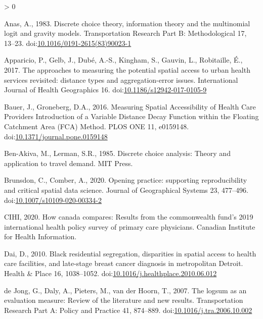 \documentclass[]{elsarticle} %
\newlength{\cslhangindent}
\newenvironment{CSLReferences}[2] %
 {%
  \setlength{\parindent}{0pt}
  \ifodd #1 \everypar{\setlength{\hangindent}{\cslhangindent}}\ignorespaces\fi
  \ifnum #2 > 0
  \setlength{\parskip}{#2\baselineskip}
  \fi
 }%
 {}
\begin{document}
\hypertarget{refs}{}
\begin{CSLReferences}{1}{0}
\leavevmode\hypertarget{ref-anas1983}{}%
Anas, A., 1983. Discrete choice theory, information theory and the
multinomial logit and gravity models. Transportation Research Part B:
Methodological 17, 13--23.
doi:\href{https://doi.org/10.1016/0191-2615(83)90023-1}{10.1016/0191-2615(83)90023-1}

\leavevmode\hypertarget{ref-apparicio2017}{}%
Apparicio, P., Gelb, J., Dubé, A.-S., Kingham, S., Gauvin, L.,
Robitaille, É., 2017. The approaches to measuring the potential spatial
access to urban health services revisited: distance types and
aggregation-error issues. International Journal of Health Geographics
16.
doi:\href{https://doi.org/10.1186/s12942-017-0105-9}{10.1186/s12942-017-0105-9}

\leavevmode\hypertarget{ref-bauer2016}{}%
Bauer, J., Groneberg, D.A., 2016. Measuring Spatial Accessibility of
Health Care Providers {{}} Introduction of a Variable Distance Decay
Function within the Floating Catchment Area (FCA) Method. PLOS ONE 11,
e0159148.
doi:\href{https://doi.org/10.1371/journal.pone.0159148}{10.1371/journal.pone.0159148}

\leavevmode\hypertarget{ref-ben1985}{}%
Ben-Akiva, M., Lerman, S.R., 1985. Discrete choice analysis: Theory and
application to travel demand. MIT Press.

\leavevmode\hypertarget{ref-brunsdon2020}{}%
Brunsdon, C., Comber, A., 2020. Opening practice: supporting
reproducibility and critical spatial data science. Journal of
Geographical Systems 23, 477--496.
doi:\href{https://doi.org/10.1007/s10109-020-00334-2}{10.1007/s10109-020-00334-2}

\leavevmode\hypertarget{ref-cihi2020}{}%
CIHI, 2020. How canada compares: Results from the commonwealth fund's
2019 international health policy survey of primary care physicians.
Canadian Institute for Health Information.

\leavevmode\hypertarget{ref-dai2010}{}%
Dai, D., 2010. Black residential segregation, disparities in spatial
access to health care facilities, and late-stage breast cancer diagnosis
in metropolitan Detroit. Health \& Place 16, 1038--1052.
doi:\href{https://doi.org/10.1016/j.healthplace.2010.06.012}{10.1016/j.healthplace.2010.06.012}

\leavevmode\hypertarget{ref-dejong2007}{}%
de Jong, G., Daly, A., Pieters, M., van der Hoorn, T., 2007. The logsum
as an evaluation measure: Review of the literature and new results.
Transportation Research Part A: Policy and Practice 41, 874--889.
doi:\href{https://doi.org/10.1016/j.tra.2006.10.002}{10.1016/j.tra.2006.10.002}


\end{CSLReferences}
\end{document}
